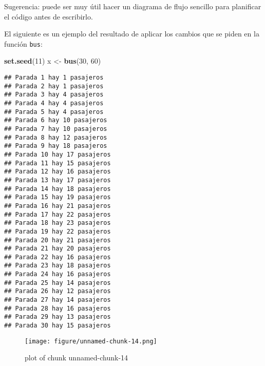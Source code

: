 \documentclass[]{article}
\makeatletter
\newenvironment{Shaded}{}{}
\newcommand{\KeywordTok}[1]{\textcolor[rgb]{0.00,0.44,0.13}{\textbf{{#1}}}}
\newcommand{\DecValTok}[1]{\textcolor[rgb]{0.25,0.63,0.44}{{#1}}}
\newcommand{\NormalTok}[1]{{#1}}
\def\maxwidth{\ifdim\Gin@nat@width>\linewidth\linewidth
\else\Gin@nat@width\fi}
\let\Oldincludegraphics\includegraphics
\renewcommand{\includegraphics}[1]{\Oldincludegraphics[width=\maxwidth]{#1}}
\makeatother
\begin{document}
Sugerencia: puede ser muy útil hacer un diagrama de flujo sencillo para
planificar el código antes de escribirlo.

El siguiente es un ejemplo del resultado de aplicar los cambios que se
piden en la función \texttt{bus}:

\begin{Shaded}
\begin{Highlighting}[]
\KeywordTok{set.seed}\NormalTok{(}\DecValTok{11}\NormalTok{)}
\NormalTok{x <- }\KeywordTok{bus}\NormalTok{(}\DecValTok{30}\NormalTok{, }\DecValTok{60}\NormalTok{)}
\end{Highlighting}
\end{Shaded}
\begin{verbatim}
## Parada 1 hay 1 pasajeros
## Parada 2 hay 1 pasajeros
## Parada 3 hay 4 pasajeros
## Parada 4 hay 4 pasajeros
## Parada 5 hay 4 pasajeros
## Parada 6 hay 10 pasajeros
## Parada 7 hay 10 pasajeros
## Parada 8 hay 12 pasajeros
## Parada 9 hay 18 pasajeros
## Parada 10 hay 17 pasajeros
## Parada 11 hay 15 pasajeros
## Parada 12 hay 16 pasajeros
## Parada 13 hay 17 pasajeros
## Parada 14 hay 18 pasajeros
## Parada 15 hay 19 pasajeros
## Parada 16 hay 21 pasajeros
## Parada 17 hay 22 pasajeros
## Parada 18 hay 23 pasajeros
## Parada 19 hay 22 pasajeros
## Parada 20 hay 21 pasajeros
## Parada 21 hay 20 pasajeros
## Parada 22 hay 16 pasajeros
## Parada 23 hay 18 pasajeros
## Parada 24 hay 16 pasajeros
## Parada 25 hay 14 pasajeros
## Parada 26 hay 12 pasajeros
## Parada 27 hay 14 pasajeros
## Parada 28 hay 16 pasajeros
## Parada 29 hay 13 pasajeros
## Parada 30 hay 15 pasajeros
\end{verbatim}
\begin{figure}[htbp]
\centering
\texttt{[image: figure/unnamed-chunk-14.png]}
\caption{plot of chunk unnamed-chunk-14}
\end{figure}
\end{document}
